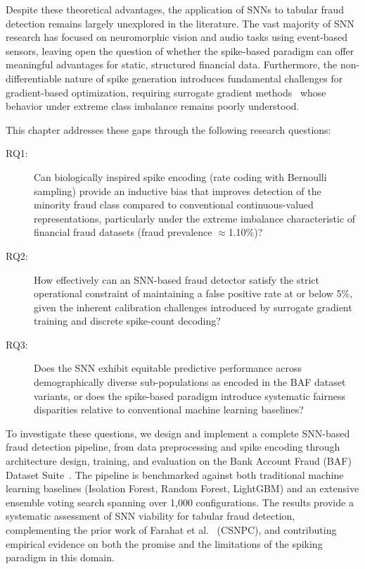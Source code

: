 Despite these theoretical advantages, the application of SNNs to tabular fraud detection remains largely unexplored in the literature. The vast majority of SNN research has focused on neuromorphic vision and audio tasks using event-based sensors, leaving open the question of whether the spike-based paradigm can offer meaningful advantages for static, structured financial data. Furthermore, the non-differentiable nature of spike generation introduces fundamental challenges for gradient-based optimization, requiring surrogate gradient methods~\cite{zenke2021remarkable,eshraghian2021training} whose behavior under extreme class imbalance remains poorly understood.

This chapter addresses these gaps through the following research questions:

\begin{description}
\item[RQ1:] Can biologically inspired spike encoding (rate coding with Bernoulli sampling) provide an inductive bias that improves detection of the minority fraud class compared to conventional continuous-valued representations, particularly under the extreme imbalance characteristic of financial fraud datasets (fraud prevalence $\approx$1.10\%)?
\item[RQ2:] How effectively can an SNN-based fraud detector satisfy the strict operational constraint of maintaining a false positive rate at or below 5\%, given the inherent calibration challenges introduced by surrogate gradient training and discrete spike-count decoding?
\item[RQ3:] Does the SNN exhibit equitable predictive performance across demographically diverse sub-populations as encoded in the BAF dataset variants, or does the spike-based paradigm introduce systematic fairness disparities relative to conventional machine learning baselines?
\end{description}

To investigate these questions, we design and implement a complete SNN-based fraud detection pipeline, from data preprocessing and spike encoding through architecture design, training, and evaluation on the Bank Account Fraud (BAF) Dataset Suite~\cite{jesus2022bank,feedzai2022baf}. The pipeline is benchmarked against both traditional machine learning baselines (Isolation Forest, Random Forest, LightGBM) and an extensive ensemble voting search spanning over 1,000 configurations. The results provide a systematic assessment of SNN viability for tabular fraud detection, complementing the prior work of Farahat et al.~\cite{farahat2025objective} (CSNPC), and contributing empirical evidence on both the promise and the limitations of the spiking paradigm in this domain.

